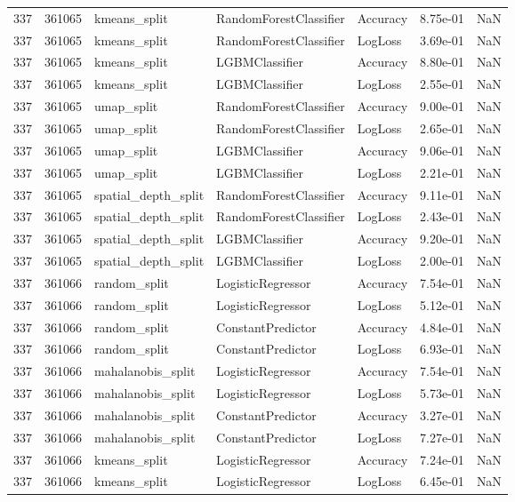 \begin{tabular}{rrlllrr}
337 & 361065 & kmeans\_split & RandomForestClassifier & Accuracy & 8.75e-01 & NaN \\
337 & 361065 & kmeans\_split & RandomForestClassifier & LogLoss & 3.69e-01 & NaN \\
337 & 361065 & kmeans\_split & LGBMClassifier & Accuracy & 8.80e-01 & NaN \\
337 & 361065 & kmeans\_split & LGBMClassifier & LogLoss & 2.55e-01 & NaN \\
337 & 361065 & umap\_split & RandomForestClassifier & Accuracy & 9.00e-01 & NaN \\
337 & 361065 & umap\_split & RandomForestClassifier & LogLoss & 2.65e-01 & NaN \\
337 & 361065 & umap\_split & LGBMClassifier & Accuracy & 9.06e-01 & NaN \\
337 & 361065 & umap\_split & LGBMClassifier & LogLoss & 2.21e-01 & NaN \\
337 & 361065 & spatial\_depth\_split & RandomForestClassifier & Accuracy & 9.11e-01 & NaN \\
337 & 361065 & spatial\_depth\_split & RandomForestClassifier & LogLoss & 2.43e-01 & NaN \\
337 & 361065 & spatial\_depth\_split & LGBMClassifier & Accuracy & 9.20e-01 & NaN \\
337 & 361065 & spatial\_depth\_split & LGBMClassifier & LogLoss & 2.00e-01 & NaN \\
337 & 361066 & random\_split & LogisticRegressor & Accuracy & 7.54e-01 & NaN \\
337 & 361066 & random\_split & LogisticRegressor & LogLoss & 5.12e-01 & NaN \\
337 & 361066 & random\_split & ConstantPredictor & Accuracy & 4.84e-01 & NaN \\
337 & 361066 & random\_split & ConstantPredictor & LogLoss & 6.93e-01 & NaN \\
337 & 361066 & mahalanobis\_split & LogisticRegressor & Accuracy & 7.54e-01 & NaN \\
337 & 361066 & mahalanobis\_split & LogisticRegressor & LogLoss & 5.73e-01 & NaN \\
337 & 361066 & mahalanobis\_split & ConstantPredictor & Accuracy & 3.27e-01 & NaN \\
337 & 361066 & mahalanobis\_split & ConstantPredictor & LogLoss & 7.27e-01 & NaN \\
337 & 361066 & kmeans\_split & LogisticRegressor & Accuracy & 7.24e-01 & NaN \\
337 & 361066 & kmeans\_split & LogisticRegressor & LogLoss & 6.45e-01 & NaN \\

\end{tabular}
